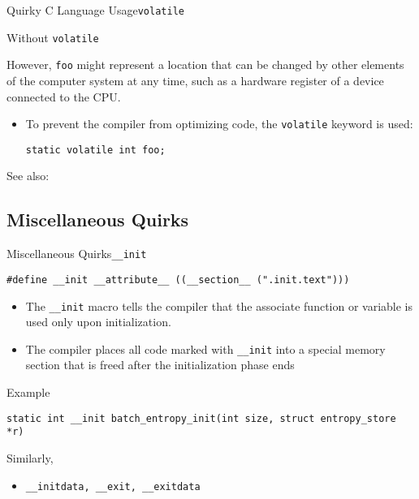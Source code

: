 \begin{frame}{Quirky C Language Usage}{\texttt{volatile}}
  \begin{minipage}{.44\linewidth}
    \begin{block}{Without \texttt{volatile}}
      \begin{center}
      \end{center}
    \end{block}
  \end{minipage}\hfill
  \begin{minipage}{.50\linewidth}
    However, \texttt{foo} might represent a location that can be changed by other elements
    of the computer system at any time, such as a hardware register of a device connected
    to the CPU.
  \end{minipage}
  \begin{itemize}
  \item[] To prevent the compiler from optimizing code, the \texttt{volatile} keyword is
    used:
    \begin{center}
      \texttt{static volatile int foo;}
    \end{center}
  \end{itemize}
\end{frame}

See also: 

\subsection{Miscellaneous Quirks}

\begin{frame}[fragile=singleslide]{Miscellaneous Quirks}{\texttt{\_\_init}}
  \begin{small}
    \texttt{#define __init __attribute__ ((__section__ (".init.text")))}
  \end{small}
  \begin{itemize}
  \item The \verb|__init| macro tells the compiler that the associate function or variable
    is used only upon initialization.
  \item The compiler places all code marked with \verb|__init| into a special memory
    section that is freed after the initialization phase ends
  \end{itemize}
  \begin{block}{Example}
    \begin{small}
      \texttt{static int __init batch_entropy_init(int size, struct entropy_store *r)}
    \end{small}
  \end{block}
  Similarly,
  \begin{itemize}
    \item[] \verb|__initdata, __exit, __exitdata|
  \end{itemize}
\end{frame}

